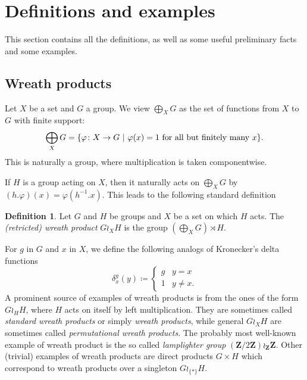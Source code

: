 \documentclass[a4paper]{article}
\theoremstyle{definition}
\newtheorem{defn}[lem]{Definition}
\newcommand*{\field}[1]{\mathbf{#1}}
\newcommand*{\Z}{\field{Z}}
\newcommand{\setst}[2]{\{#1\ |\ #2\}}
\begin{document}
\section{Definitions and examples}\label{Section:Def}
This section contains all the definitions, as well as some useful preliminary facts and some examples.
%
%
%
%
%
%
%
%
%
%
\subsection{Wreath products}
%
%
%
%
%
Let $X$ be a set and $G$ a group. We view
$\bigoplus_XG$ as the set of functions from $X$ to $G$ with finite support:
\[
	\bigoplus_XG=\setst{\varphi\colon X\to G}{\varphi(x)=1 \textnormal{ for all but finitely many }x}.
\]
This is naturally a group, where multiplication is taken componentwise.

If $H$ is a group acting on $X$, then it naturally acts on $\bigoplus_XG$
by $(h.\varphi)(x)=\varphi(h^{-1}.x)$.
This leads to the following standard definition
\begin{defn}\label{Def:WreathProd}
Let $G$ and $H$ be groups and $X$ be a set on which $H$ acts.
The \emph{(retricted) wreath product} $G\wr_XH$ is the group $(\bigoplus_XG)\rtimes H$.
\end{defn}
For $g$ in $G$ and $x$ in $X$, we define the following analogs of Kronecker's delta functions
\begin{equation*}
\delta_x^g (y) \coloneqq
\begin{cases}
g & y = x \\
1 & y \neq x.
\end{cases}
\end{equation*}
A prominent source of examples of wreath products is from the ones of the form $G\wr_HH$, where $H$ acts on itself by left multiplication.
They are sometimes called \emph{standard wreath products} or simply \emph{wreath products}, while general $G\wr_XH$ are sometimes called \emph{permutational wreath products}.
The probably most well-known example of wreath product is the so called \emph{lamplighter group} $(\Z/2\Z)\wr_\Z\Z$.
Other (trivial) examples of wreath products are direct products $G\times H$ which correspond to wreath products over a singleton $G\wr_{\{*\}}H$.
%
%
%
%
%
%
%
%
%
%
\end{document}
